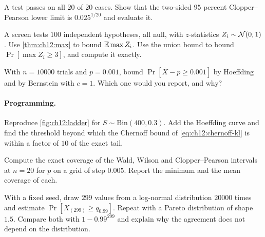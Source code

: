 \begin{exercise}\label{exr:ch12:allpass}
A test passes on all $20$ of $20$ cases. Show that the two-sided $95$ percent Clopper--Pearson lower limit is $0.025^{1/20}$ and evaluate it.
\end{exercise}

\begin{exercise}\label{exr:ch12:hundred}
A screen tests $100$ independent hypotheses, all null, with $z$-statistics $Z_i\sim\mathcal{N}(0,1)$. Use \cref{thm:ch12:max} to bound $\mathbb{E}\max Z_i$. Use the union bound to bound $\Pr[\max Z_i\ge3]$, and compute it exactly.
\end{exercise}

\begin{exercise}\label{exr:ch12:bern}
With $n=10000$ trials and $p=0.001$, bound $\Pr[\bar X-p\ge0.001]$ by Hoeffding and by Bernstein with $c=1$. Which one would you report, and why?
\end{exercise}

\paragraph{Programming.}

\begin{exercise}\label{exr:ch12:prog-ladder}
Reproduce \cref{fig:ch12:ladder} for $S\sim\mathrm{Bin}(400,0.3)$. Add the Hoeffding curve and find the threshold beyond which the Chernoff bound of \cref{eq:ch12:chernoff-kl} is within a factor of $10$ of the exact tail.
\end{exercise}

\begin{exercise}\label{exr:ch12:prog-coverage}
Compute the exact coverage of the Wald, Wilson and Clopper--Pearson intervals at $n=20$ for $p$ on a grid of step $0.005$. Report the minimum and the mean coverage of each.
\end{exercise}

\begin{exercise}\label{exr:ch12:prog-order}
With a fixed seed, draw $299$ values from a log-normal distribution $20000$ times and estimate $\Pr[X_{(299)}\ge q_{0.99}]$. Repeat with a Pareto distribution of shape $1.5$. Compare both with $1-0.99^{299}$ and explain why the agreement does not depend on the distribution.
\end{exercise}


